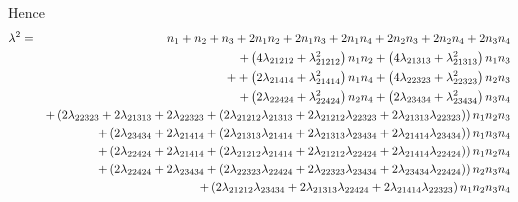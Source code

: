 \documentclass[12pt]{article}
\begin{document}
\bigskip Hence 
\begin{eqnarray}
\lambda ^{2}
&=&n_{1}+n_{2}+n_{3}+2n_{1}n_{2}+2n_{1}n_{3}+2n_{1}n_{4}+2n_{2}n_{3}+2n_{2}n_{4}+2n_{3}n_{4}
\notag \\
&&+\left( 4\lambda _{21212}+\lambda _{21212}^{2}\right) n_{1}n_{2}+\left(
4\lambda _{21313}+\lambda _{21313}^{2}\right) n_{1}n_{3}  \notag \\
&&++\left( 2\lambda _{21414}+\lambda _{21414}^{2}\right) n_{1}n_{4}+\left(
4\lambda _{22323}+\lambda _{22323}^{2}\right) n_{2}n_{3}  \notag \\
&&+\left( 2\lambda _{22424}+\lambda _{22424}^{2}\right) n_{2}n_{4}+\left(
2\lambda _{23434}+\lambda _{23434}^{2}\right) n_{3}n_{4}  \notag \\
&&+\left( 2\lambda _{22323}+2\lambda _{21313}+2\lambda _{22323}+\left(
2\lambda _{21212}\lambda _{21313}+2\lambda _{21212}\lambda _{22323}+2\lambda
_{21313}\lambda _{22323}\right) \right) n_{1}n_{2}n_{3}  \notag \\
&&+\left( 2\lambda _{23434}+2\lambda _{21414}+\left( 2\lambda
_{21313}\lambda _{21414}+2\lambda _{21313}\lambda _{23434}+2\lambda
_{21414}\lambda _{23434}\right) \right) n_{1}n_{3}n_{4}  \notag \\
&&+\left( 2\lambda _{22424}+2\lambda _{21414}+\left( 2\lambda
_{21212}\lambda _{21414}+2\lambda _{21212}\lambda _{22424}+2\lambda
_{21414}\lambda _{22424}\right) \right) n_{1}n_{2}n_{4}  \notag \\
&&+\left( 2\lambda _{22424}+2\lambda _{23434}+\left( 2\lambda
_{22323}\lambda _{22424}+2\lambda _{22323}\lambda _{23434}+2\lambda
_{23434}\lambda _{22424}\right) \right) n_{2}n_{3}n_{4}  \notag \\
&&+\left( 2\lambda _{21212}\lambda _{23434}+2\lambda _{21313}\lambda
_{22424}+2\lambda _{21414}\lambda _{22323}\right) n_{1}n_{2}n_{3}n_{4}
\end{eqnarray}
\end{document}
